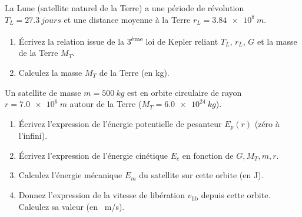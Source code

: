 \documentclass[11pt]{article}
\begin{document}
\begin{exercice}
La Lune (satellite naturel de la Terre) a une période de révolution $T_L = \SI{27,3}{jours}$ et une distance moyenne à la Terre $r_L = \SI{3,84e8}{m}$.
\begin{enumerate}
    \item Écrivez la relation issue de la 3\textsuperscript{ème} loi de Kepler reliant $T_L$, $r_L$, $G$ et la masse de la Terre $M_T$.
    \item Calculez la masse $M_T$ de la Terre (en kg).
\end{enumerate}
\end{exercice}

\begin{exercice}
Un satellite de masse $m = \SI{500}{kg}$ est en orbite circulaire de rayon $r = \SI{7,0e6}{m}$ autour de la Terre ($M_T = \SI{6,0e24}{kg}$).
\begin{enumerate}
    \item Écrivez l'expression de l'énergie potentielle de pesanteur $E_p(r)$ (zéro à l'infini).
    \item Écrivez l'expression de l'énergie cinétique $E_c$ en fonction de $G, M_T, m, r$.
    \item Calculez l'énergie mécanique $E_m$ du satellite sur cette orbite (en J).
    \item Donnez l'expression de la vitesse de libération $v_{\text{lib}}$ depuis cette orbite. Calculez sa valeur (en \SI{}{m/s}).
\end{enumerate}
\end{exercice}
\end{document}
